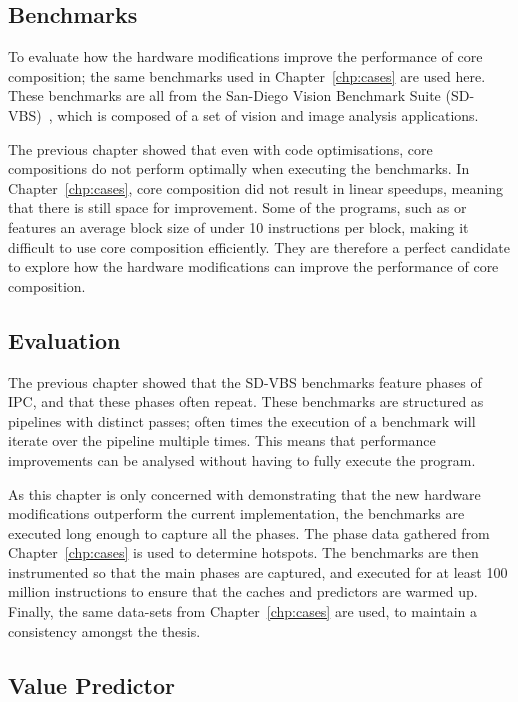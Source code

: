 \subsection{Benchmarks}
To evaluate how the hardware modifications improve the performance of core composition; the same benchmarks used in Chapter~\ref{chp:cases} are used here.
These benchmarks are all from the San-Diego Vision Benchmark Suite (SD-VBS)~\cite{sdvbs}, which is composed of a set of vision and image analysis applications.

The previous chapter showed that even with code optimisations, core compositions do not perform optimally when executing the benchmarks.
In Chapter~\ref{chp:cases}, core composition did not result in linear speedups, meaning that there is still space for improvement.
Some of the programs, such as  or  features an average block size of under 10 instructions per block, making it difficult to use core composition efficiently.
They are therefore a perfect candidate to explore how the hardware modifications can improve the performance of core composition.

\subsection{Evaluation} 
The previous chapter showed that the SD-VBS benchmarks feature phases of IPC, and that these phases often repeat.
These benchmarks are structured as pipelines with distinct passes; often times the execution of a benchmark will iterate over the pipeline multiple times.
This means that performance improvements can be analysed without having to fully execute the program.

As this chapter is only concerned with demonstrating that the new hardware modifications outperform the current implementation, the benchmarks are executed long enough to capture all the phases.
The phase data gathered from Chapter~\ref{chp:cases} is used to determine hotspots.
The benchmarks are then instrumented so that the main phases are captured, and executed for at least 100 million instructions to ensure that the caches and predictors are warmed up.
Finally, the same data-sets from Chapter~\ref{chp:cases} are used, to maintain a consistency amongst the thesis.

\subsection{Value Predictor}

